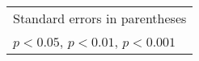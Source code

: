 \begin{table}[htbp]
\begin{tabular}{l*{44}{c}}
\hline\hline
\multicolumn{45}{l}{\footnotesize Standard errors in parentheses}\\
\multicolumn{45}{l}{\footnotesize \sym{*} \(p<0.05\), \sym{**} \(p<0.01\), \sym{***} \(p<0.001\)}\\
\end{tabular}
\end{table}
